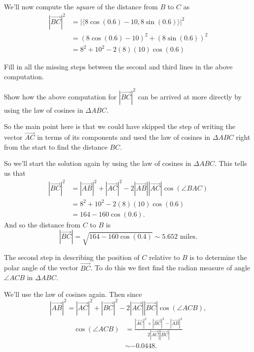 \documentclass{ximera}
\begin{document}
\begin{example}
\begin{explanation}
We'll now compute the \emph{square} of the distance from $B$ to $C$ as
\begin{align*}
         |  \overrightarrow{BC} |^2 &= |    \langle 8 \cos (0.6) - 10, 8 \sin(0.6)  \rangle    |^2  \\
                                             &= (8 \cos (0.6) - 10)^2 + (8 \sin(0.6))^2   \\
                                             &=  8^2 + 10^2 - 2(8)(10) \cos(0.6)
\end{align*}

\begin{question}  \label{Q4r345fg}
Fill in all the missing steps between the second and third lines in the above computation. 
\end{question}

\begin{question}  \label{Qer55ft4w}
Show how the above computation for $|\overrightarrow{BC}|^2$ can be arrived at more directly by using the law of cosines in $\Delta ABC$.
\end{question}

So the main point here is that we could have skipped the step of writing the vector $\overrightarrow{AC}$ in terms of its components and used the law of cosines in $\Delta ABC$ right from the start to find the distance $BC$. 

So we'll start the solution again by using the law of cosines in $\Delta ABC$. This tells us that
\begin{align*}
   |  \overrightarrow{BC} |^2 &=  |\overrightarrow{AB}|^2 + |\overrightarrow{AC}|^2 - 2|\overrightarrow{AB}||\overrightarrow{AC}| \cos (\angle BAC)  \\
                                          &= 8^2 + 10^2 - 2(8)(10) \cos(0.6)  \\
                                          &= 164-160 \cos(0.6) .
\end{align*}
And so the distance from $C$ to $B$ is
\[
   |  \overrightarrow{BC} | = \sqrt{164-160 \cos(0.4)} \sim 5.652 \text{ miles} .
\]

The second step in describing the position of $C$ relative to $B$ is to determine the polar angle of the vector $\overrightarrow{BC}$. To do this we first find the radian measure of angle $\angle ACB$ in $\Delta ABC$.

We'll use the law of cosines again. Then since
\[
    |\overrightarrow{AB}|^2 =  |\overrightarrow{AC}|^2 + |\overrightarrow{BC}|^2 - 2|\overrightarrow{AC}||\overrightarrow{BC}| \cos (\angle ACB)  ,
\]
\begin{align*}
   \cos(\angle ACB) &= \frac{|\overrightarrow{AC}|^2 + |\overrightarrow{BC}|^2 - |\overrightarrow{AB}|^2}{2|\overrightarrow{AC}||\overrightarrow{BC}|} \\
                           &\sim -0.0448 .
\end{align*}
 

\end{explanation}
\end{example}
\end{document}
